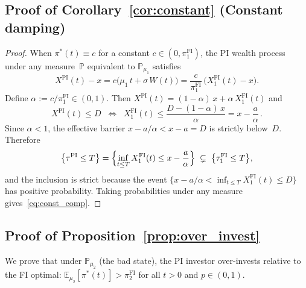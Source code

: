 \documentclass[12pt]{article}
\theoremstyle{remark}
\theoremstyle{definition}
\newcommand{\E}{\mathbb{E}}
\newcommand{\Prob}{\mathbb{P}}
\newcommand{\FI}{\mathrm{FI}}
\newcommand{\PI}{\mathrm{PI}}
\begin{document}
\subsection{Proof of Corollary~\ref{cor:constant}
  (Constant damping)}
\label{sec:proof_constant}

\begin{proof}
When $\pi^*(t) \equiv c$ for a constant $c \in (0, \pi_1^{\FI})$, the
PI wealth process under any measure~$\Prob$ equivalent to $\Prob_{\mu_1}$
satisfies
\begin{equation}\label{eq:constant_wealth}
  X^{\PI}(t) - x = c\bigl(\mu_1\,t + \sigma\,W(t)\bigr)
  = \frac{c}{\pi_1^{\FI}}\,\bigl(X_1^{\FI}(t) - x\bigr).
\end{equation}
Define $\alpha := c/\pi_1^{\FI} \in (0,1)$.
Then $X^{\PI}(t) = (1-\alpha)\,x + \alpha\,X_1^{\FI}(t)$ and
\begin{equation}\label{eq:constant_ruin}
  X^{\PI}(t) \le D
  \;\;\Longleftrightarrow\;\;
  X_1^{\FI}(t) \le \frac{D - (1-\alpha)\,x}{\alpha}
  = x - \frac{a}{\alpha}\,.
\end{equation}
Since $\alpha < 1$, the effective barrier $x - a/\alpha < x - a = D$ is
strictly below~$D$.
Therefore
\begin{equation}\label{eq:constant_inclusion}
  \bigl\{\tau^{\PI} \le T\bigr\}
  = \Bigl\{\inf_{t \le T} X_1^{\FI}(t) \le x - \frac{a}{\alpha}\Bigr\}
  \;\subsetneq\;
  \bigl\{\tau_1^{\FI} \le T\bigr\},
\end{equation}
and the inclusion is strict because the event
$\{x - a/\alpha < \inf_{t \le T} X_1^{\FI}(t) \le D\}$ has positive
probability.
Taking probabilities under any measure gives~\eqref{eq:const_comp}.
\end{proof}


\subsection{Proof of Proposition~\ref{prop:over_invest}}\label{sec:proof_over_invest}

We prove that under $\Prob_{\mu_2}$ (the bad state), the PI investor
over-invests relative to the FI optimal: $\E_{\mu_2}[\pi^*(t)] > \pi_2^{\FI}$
for all $t > 0$ and $p \in (0,1)$.
\end{document}

